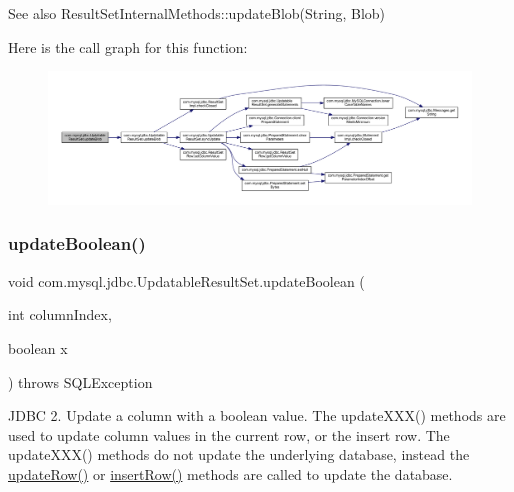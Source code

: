 \begin{DoxySeeAlso}{See also}
Result\+Set\+Internal\+Methods\+::update\+Blob(\+String, Blob) 
\end{DoxySeeAlso}
Here is the call graph for this function\+:
\nopagebreak
\begin{figure}[H]
\begin{center}
\leavevmode
\includegraphics[width=350pt]{classcom_1_1mysql_1_1jdbc_1_1_updatable_result_set_a45f34643eaea2f5cdf81f8ac0589607c_cgraph}
\end{center}
\end{figure}
\mbox{\label{classcom_1_1mysql_1_1jdbc_1_1_updatable_result_set_ad7bcfc97b47f3037e44a2b4271a92f61}} 
\subsubsection{\texorpdfstring{update\+Boolean()}{updateBoolean()}\hspace{0.1cm}{\footnotesize\ttfamily [1/2]}}
{\footnotesize\ttfamily void com.\+mysql.\+jdbc.\+Updatable\+Result\+Set.\+update\+Boolean (\begin{DoxyParamCaption}\item[{int}]{column\+Index,  }\item[{boolean}]{x }\end{DoxyParamCaption}) throws S\+Q\+L\+Exception}

J\+D\+BC 2. Update a column with a boolean value. The update\+X\+X\+X() methods are used to update column values in the current row, or the insert row. The update\+X\+X\+X() methods do not update the underlying database, instead the \mbox{\hyperlink{classcom_1_1mysql_1_1jdbc_1_1_updatable_result_set_a919969ba4b3c7cbc7b18605e9f31a746}{update\+Row()}} or \mbox{\hyperlink{classcom_1_1mysql_1_1jdbc_1_1_updatable_result_set_aef041f8d9d0778083716fc26652648fa}{insert\+Row()}} methods are called to update the database.


